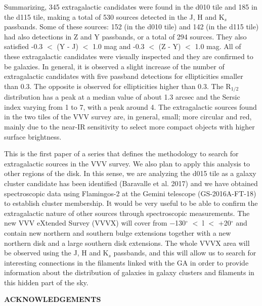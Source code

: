 \documentclass[preprint2]{aastex}
\begin{document}
 Summarizing,  345 extragalactic candidates were found in the 
 d010 tile and 185 in the d115 tile, making a total of 530 sources detected
 in the J, H and K$_s$ passbands.  Some of these sources: 152 (in the d010 tile)
  and 142 (in the d115 tile) had also detections in Z and Y
  passbands, or a  total of 294 sources. They also satisfied
  -0.3 $<$ (Y - J) $<$ 1.0 mag and
-0.3 $<$ (Z - Y) $<$ 1.0 mag.  All of these extragalactic
  candidates were visually inspected and they are confirmed to be galaxies.
  In general, it is observed a slight increase of
  the number of  extragalactic candidates with five passband
  detections for ellipticities smaller than 0.3.  The opposite is observed
  for ellipticities higher than 0.3.
The R$_{1/2}$
distribution has a peak at a median value of about 1.3 arcsec and the Sersic
index varying from 1 to 7, with a peak around 4.  The  extragalactic sources
found in the two tiles of the VVV survey are, in general, small;
more circular and red, mainly due to the near-IR sensitivity to
   select more compact objects with higher surface brightness.

This is the first paper of a series that defines the methodology to
search  for extragalactic sources in the VVV survey.  We also plan
to apply this analysis to  other regions of the disk.  
In this sense, we are analyzing the d015 tile as a galaxy cluster
candidate has been identified (Baravalle et al. 2017) and we have
obtained spectroscopic data 
using Flamingos-2 at the Gemini 
telescope (GS-2016A-FT-18) to establish cluster membership.
It would be very useful to be able to confirm the extragalactic 
nature of other sources through spectroscopic measurements.
The new VVV eXtended Survey (VVVX) will cover from
−130$^{\circ}$ $<$ l $<$ +20$^{\circ}$ and contain new northern and southern
bulge extensions together with
a new northern disk  and a large southern disk extensions.   The whole VVVX
area will be observed using the J, H and K$_s$ passbands, and this will allow us
to search for interesting connections in the filaments linked with the
GA in order to provide information about the distribution of galaxies in
galaxy clusters and 
filaments
in this hidden part of the sky.


\vskip 0.5cm

{\bf ACKNOWLEDGEMENTS}
\vskip 0.5cm
 
\end{document}
